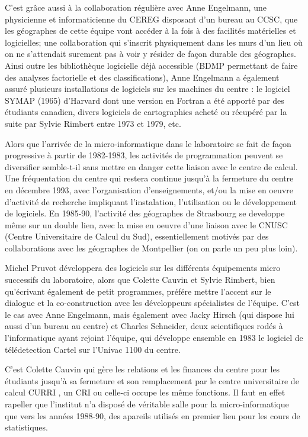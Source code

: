 C'est grâce aussi à la collaboration régulière avec Anne Engelmann, une physicienne et informaticienne du CEREG disposant d'un bureau au CCSC, que les géographes de cette équipe vont accéder à la fois à des facilités matérielles  et logicielles; une collaboration qui s'inscrit physiquement dans les murs d'un lieu où on ne s'attendait surement pas à voir y résider de façon durable des géographes. Ainsi outre les bibliothèque logicielle déjà accessible (BDMP permettant de faire des analyses factorielle et des classifications), Anne Engelmann a également assuré plusieurs installations de logiciels sur les machines du centre : le logiciel SYMAP (1965) d'Harvard dont une version en Fortran a été apporté par des étudiants canadien, divers logiciels de cartographies acheté ou récupéré par la suite par Sylvie Rimbert entre 1973 et 1979, etc.

Alors que l'arrivée de la micro-informatique dans le laboratoire se fait de façon progressive à partir de 1982-1983, les activités de programmation peuvent se diversifier semble-t-il sans mettre en danger cette liaison avec le centre de calcul. Une fréquentation du centre qui restera continue jusqu'à la fermeture du centre en décembre 1993, avec l'organisation d'enseignements, et/ou la mise en oeuvre d'activité de recherche impliquant l'instalation, l'utilisation ou le développement de logiciels. En 1985-90, l'activité des géographes de Strasbourg se developpe même sur un double lien, avec la mise en oeuvre d'une liaison avec le CNUSC (Centre Universitaire de Calcul du Sud), essentiellement motivés par des collaborations avec les géographes de Montpellier (on on parle un peu plus loin).

Michel Pruvot développera des logiciels sur les différents équipements micro successifs du laboratoire, alors que Colette Cauvin et Sylvie Rimbert, bien qu'écrivant également de petit programmes, préfére mettre l'accent sur le dialogue et la co-construction avec les développeurs spécialistes de l'équipe. C'est le cas avec Anne Engelmann, mais également avec Jacky Hirsch (qui dispose lui aussi d'un bureau au centre) et Charles Schneider, deux scientifiques rodés à l'informatique ayant rejoint l'équipe, qui développe ensemble en 1983 le logiciel de télédetection Cartel sur l'Univac 1100 du centre.

C'est Colette Cauvin qui gère les relations et les finances du centre pour les étudiants jusqu'à sa fermeture et son remplacement par le centre universitaire de calcul CURRI , un CRI ou celle-ci occupe les même fonctions. Il faut en effet rapeller que l'institut n'a disposé de véritable salle pour la micro-informatique que vers les années 1988-90, des apareils utilisés en premier lieu pour les cours de statistiques.

